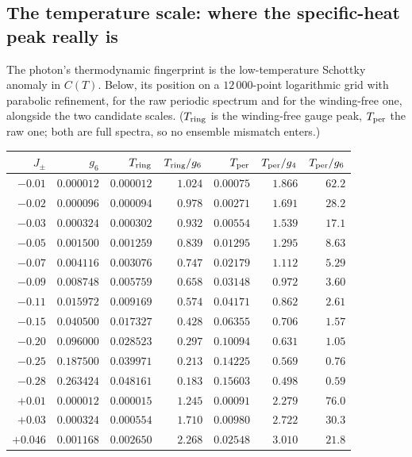 \documentclass[11pt,a4paper]{article}
\newcommand{\Jpm}{J_{\pm}}
\newcommand{\gfour}{g_4}
\newcommand{\gsix}{g_6}
\begin{document}
\subsection{The temperature scale: where the specific-heat peak really is}

The photon's thermodynamic fingerprint is the low-temperature Schottky
anomaly in $C(T)$.  Below, its position on a $12\,000$-point logarithmic
grid with parabolic refinement, for the raw periodic spectrum and for the
winding-free one, alongside the two candidate scales.  ($T_{\rm ring}$ is
the winding-free gauge peak, $T_{\rm per}$ the raw one; both are full
spectra, so no ensemble mismatch enters.)

\begin{center}
\small
\begin{tabular}{rrrrrrr}
\toprule
$\Jpm$ & $\gsix$ & $T_{\rm ring}$ & $T_{\rm ring}/\gsix$ &
$T_{\rm per}$ & $T_{\rm per}/\gfour$ & $T_{\rm per}/\gsix$\\
\midrule
$-0.01$ & $0.000012$ & $0.000012$ & $1.024$ & $0.00075$ & $1.866$ & $62.2$\\
$-0.02$ & $0.000096$ & $0.000094$ & $0.978$ & $0.00271$ & $1.691$ & $28.2$\\
$-0.03$ & $0.000324$ & $0.000302$ & $0.932$ & $0.00554$ & $1.539$ & $17.1$\\
$-0.05$ & $0.001500$ & $0.001259$ & $0.839$ & $0.01295$ & $1.295$ & $8.63$\\
$-0.07$ & $0.004116$ & $0.003076$ & $0.747$ & $0.02179$ & $1.112$ & $5.29$\\
$-0.09$ & $0.008748$ & $0.005759$ & $0.658$ & $0.03148$ & $0.972$ & $3.60$\\
$-0.11$ & $0.015972$ & $0.009169$ & $0.574$ & $0.04171$ & $0.862$ & $2.61$\\
$-0.15$ & $0.040500$ & $0.017327$ & $0.428$ & $0.06355$ & $0.706$ & $1.57$\\
$-0.20$ & $0.096000$ & $0.028523$ & $0.297$ & $0.10094$ & $0.631$ & $1.05$\\
$-0.25$ & $0.187500$ & $0.039971$ & $0.213$ & $0.14225$ & $0.569$ & $0.76$\\
$-0.28$ & $0.263424$ & $0.048161$ & $0.183$ & $0.15603$ & $0.498$ & $0.59$\\
\midrule
$+0.01$ & $0.000012$ & $0.000015$ & $1.245$ & $0.00091$ & $2.279$ & $76.0$\\
$+0.03$ & $0.000324$ & $0.000554$ & $1.710$ & $0.00980$ & $2.722$ & $30.3$\\
$+0.046$ & $0.001168$ & $0.002650$ & $2.268$ & $0.02548$ & $3.010$ & $21.8$\\
\bottomrule
\end{tabular}
\end{center}
\end{document}
